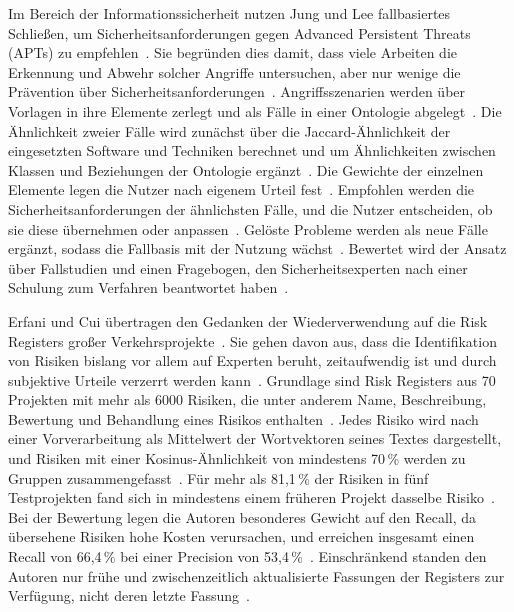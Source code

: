 Im Bereich der Informationssicherheit nutzen Jung und Lee fallbasiertes Schließen, um Sicherheitsanforderungen gegen Advanced Persistent Threats (APTs) zu empfehlen~\cite[S.~1]{Jung2023}.
Sie begründen dies damit, dass viele Arbeiten die Erkennung und Abwehr solcher Angriffe untersuchen, aber nur wenige die Prävention über Sicherheitsanforderungen~\cite[S.~1]{Jung2023}.
Angriffsszenarien werden über Vorlagen in ihre Elemente zerlegt und als Fälle in einer Ontologie abgelegt~\cite[S.~1]{Jung2023}.
Die Ähnlichkeit zweier Fälle wird zunächst über die Jaccard-Ähnlichkeit der eingesetzten Software und Techniken berechnet und um Ähnlichkeiten zwischen Klassen und Beziehungen der Ontologie ergänzt~\cite[S.~9--10]{Jung2023}.
Die Gewichte der einzelnen Elemente legen die Nutzer nach eigenem Urteil fest~\cite[S.~23]{Jung2023}.
Empfohlen werden die Sicherheitsanforderungen der ähnlichsten Fälle, und die Nutzer entscheiden, ob sie diese übernehmen oder anpassen~\cite[S.~23]{Jung2023}.
Gelöste Probleme werden als neue Fälle ergänzt, sodass die Fallbasis mit der Nutzung wächst~\cite[S.~1]{Jung2023}.
Bewertet wird der Ansatz über Fallstudien und einen Fragebogen, den Sicherheitsexperten nach einer Schulung zum Verfahren beantwortet haben~\cite[S.~23]{Jung2023}.

Erfani und Cui übertragen den Gedanken der Wiederverwendung auf die Risk Registers großer Verkehrsprojekte~\cite[S.~1]{Erfani2022}.
Sie gehen davon aus, dass die Identifikation von Risiken bislang vor allem auf Experten beruht, zeitaufwendig ist und durch subjektive Urteile verzerrt werden kann~\cite[S.~1]{Erfani2022}.
Grundlage sind Risk Registers aus 70 Projekten mit mehr als 6000 Risiken, die unter anderem Name, Beschreibung, Bewertung und Behandlung eines Risikos enthalten~\cite[S.~3--4]{Erfani2022}.
Jedes Risiko wird nach einer Vorverarbeitung als Mittelwert der Wortvektoren seines Textes dargestellt, und Risiken mit einer Kosinus-Ähnlichkeit von mindestens 70\,\% werden zu Gruppen zusammengefasst~\cite[S.~4]{Erfani2022}.
Für mehr als 81,1\,\% der Risiken in fünf Testprojekten fand sich in mindestens einem früheren Projekt dasselbe Risiko~\cite[S.~8]{Erfani2022}.
Bei der Bewertung legen die Autoren besonderes Gewicht auf den Recall, da übersehene Risiken hohe Kosten verursachen, und erreichen insgesamt einen Recall von 66,4\,\% bei einer Precision von 53,4\,\%~\cite[S.~8]{Erfani2022}.
Einschränkend standen den Autoren nur frühe und zwischenzeitlich aktualisierte Fassungen der Registers zur Verfügung, nicht deren letzte Fassung~\cite[S.~3]{Erfani2022}.

